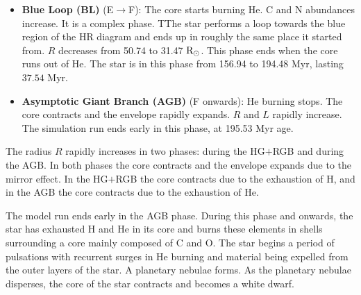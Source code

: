 \begin{itemize}
    \item  \textbf{Blue Loop (BL)} (E$\rightarrow$F): The core starts burning He. C and N abundances increase. It is a complex phase. TThe star performs a loop towards the blue region of the HR diagram and ends up in roughly the same place it started from. $R$ decreases from 50.74 to 31.47 ${\rm R}_\odot$. This phase ends when the core runs out of He. The star is in this phase from 156.94 to 194.48 Myr, lasting $37.54$ Myr.
    \item  \textbf{Asymptotic Giant Branch (AGB)} (F onwards): He burning stops. The core contracts and the envelope rapidly expands. $R$ and $L$ rapidly increase. The simulation run ends early in this phase, at 195.53 Myr age.
\end{itemize}

The radius $R$ rapidly increases in two phases: during the HG$+$RGB and during the AGB. In both phases the core contracts and the envelope expands due to the mirror effect. In the HG$+$RGB the core contracts due to the exhaustion of H, and in the AGB the core contracts due to the exhaustion of He.

The model run ends early in the AGB phase. During this phase and onwards, the star has exhausted H and He in its core and burns these elements in shells surrounding a core mainly composed of C and O. The star begins a period of pulsations with recurrent surges in He burning and material being expelled from the outer layers of the star. A planetary nebulae forms. As the planetary nebulae disperses, the core of the star contracts and becomes a white dwarf.


